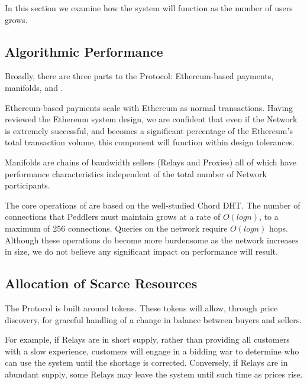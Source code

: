
In this section we examine how the system will function as the
number of users grows.

\subsection{Algorithmic Performance}

Broadly, there are three parts to the \Orchid{} Protocol: Ethereum-based
payments, manifolds, and \tOM{}.

Ethereum-based payments scale with Ethereum as normal transactions.
Having reviewed the Ethereum system design, we are confident that even
if the \Orchid{} Network is extremely successful, and becomes a
significant percentage of the Ethereum's total transaction volume,
this component will function within design tolerances.

Manifolds are chains of bandwidth sellers (Relays and Proxies)
all of which have performance characteristics independent of the total number of
\Orchid{} Network participants.

The core operations of \tOM{} are based on the well-studied Chord
DHT. The number of connections that Peddlers must maintain grows at a
rate of $O(log{}n)$, to a maximum of 256 connections. Queries on the
network require $O(log{}n)$ hops. Although these operations do become
more burdensome as the network increases in size, we do not believe
any significant impact on performance will result.

\subsection{Allocation of Scarce Resources}

The \Orchid{} Protocol is built around tokens. These tokens will allow,
through price discovery, for graceful handling of a change in balance
between buyers and sellers.

For example, if Relays are in short supply, rather than providing all
customers with a slow experience, customers will engage in a bidding
war to determine who can use the system until the shortage is
corrected. Conversely, if Relays are in abundant supply, some Relays
may leave the system until such time as prices rise.

